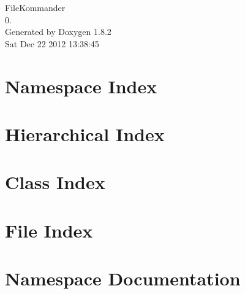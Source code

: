\documentclass{book}
\begin{document}
\hypersetup{pageanchor=false,citecolor=blue}
\begin{titlepage}
\vspace*{7cm}
\begin{center}
{\Large File\-Kommander \\[1ex]\large 0. }\\
\vspace*{1cm}
{\large Generated by Doxygen 1.8.2}\\
\vspace*{0.5cm}
{\small Sat Dec 22 2012 13:38:45}\\
\end{center}
\end{titlepage}
\clearemptydoublepage
{}
\tableofcontents
\clearemptydoublepage
{}
\hypersetup{pageanchor=true,citecolor=blue}
\chapter{Namespace Index}

\chapter{Hierarchical Index}

\chapter{Class Index}

\chapter{File Index}

\chapter{Namespace Documentation}










\end{document}
